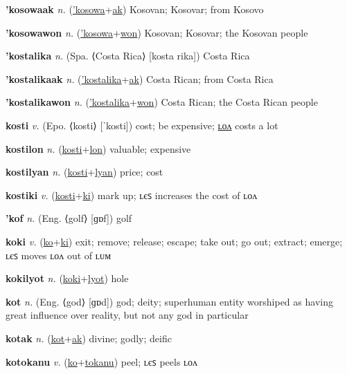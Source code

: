 \textbf{\hypertarget{'kosowaak}{'kosowaak}} \textit{n.} (\hyperlink{'kosowa}{'kosowa}+\allowbreak \hyperlink{ak}{ak})
Kosovan; Kosovar; from Kosovo

\textbf{\hypertarget{'kosowawon}{'kosowawon}} \textit{n.} (\hyperlink{'kosowa}{'kosowa}+\allowbreak \hyperlink{won}{won})
Kosovan; Kosovar; the Kosovan people

\textbf{\hypertarget{'kostalika}{'kostalika}} \textit{n.} (Spa. ⟨Costa Rica⟩ [kosta rika])
Costa Rica

\textbf{\hypertarget{'kostalikaak}{'kostalikaak}} \textit{n.} (\hyperlink{'kostalika}{'kostalika}+\allowbreak \hyperlink{ak}{ak})
Costa Rican; from Costa Rica

\textbf{\hypertarget{'kostalikawon}{'kostalikawon}} \textit{n.} (\hyperlink{'kostalika}{'kostalika}+\allowbreak \hyperlink{won}{won})
Costa Rican; the Costa Rican people

\textbf{\hypertarget{kosti}{kosti}} \textit{v.} (Epo. ⟨kosti⟩ [ˈkosti])
cost; be expensive; \hyperlink{kostilon}{ʟᴏᴧ} costs a lot

\textbf{\hypertarget{kostilon}{kostilon}} \textit{n.} (\hyperlink{kosti}{kosti}+\allowbreak \hyperlink{lon}{lon})
valuable; expensive

\textbf{\hypertarget{kostilyan}{kostilyan}} \textit{n.} (\hyperlink{kosti}{kosti}+\allowbreak \hyperlink{lyan}{lyan})
price; cost

\textbf{\hypertarget{kostiki}{kostiki}} \textit{v.} (\hyperlink{kosti}{kosti}+\allowbreak \hyperlink{ki}{ki})
mark up; ʟєꜱ increases the cost of ʟᴏᴧ

\textbf{\hypertarget{'kof}{'kof}} \textit{n.} (Eng. ⟨golf⟩ [ɡɒf])
golf

\textbf{\hypertarget{koki}{koki}} \textit{v.} (\hyperlink{ko}{ko}+\allowbreak \hyperlink{ki}{ki})
exit; remove; release; escape; take out; go out; extract; emerge; ʟєꜱ moves ʟᴏᴧ out of ʟᴜᴍ

\textbf{\hypertarget{kokilyot}{kokilyot}} \textit{n.} (\hyperlink{koki}{koki}+\allowbreak \hyperlink{lyot}{lyot})
hole

\textbf{\hypertarget{kot}{kot}} \textit{n.} (Eng. ⟨god⟩ [ɡɒd])
god; deity; superhuman entity worshiped as having great influence over reality, but not any god in particular

\textbf{\hypertarget{kotak}{kotak}} \textit{n.} (\hyperlink{kot}{kot}+\allowbreak \hyperlink{ak}{ak})
divine; godly; deific

\textbf{\hypertarget{kotokanu}{kotokanu}} \textit{v.} (\hyperlink{ko}{ko}+\allowbreak \hyperlink{tokanu}{tokanu})
peel; ʟєꜱ peels ʟᴏᴧ

